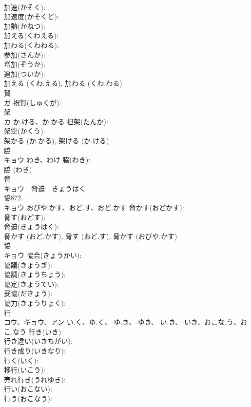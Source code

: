 \documentclass[8pt]{extreport}
\begin{document}
\begin{CJK}{UTF8}{min}
\\	加速(かそく): 
\\	加速度(かそくど): 
\\	加熱(かねつ): 
\\	加える(くわえる): 
\\	加わる(くわわる): 
\\	参加(さんか): 
\\	増加(ぞうか): 
\\	追加(ついか): 
\\	加える (くわ.える), 加わる (くわ.わる)
\\	賀			
\\	ガ		祝賀(しゅくが): 
\\	架			
\\	カ	か.ける、か.かる	担架(たんか): 
\\	架空(かくう): 
\\	架かる (か.かる), 架ける (か.ける)
\\	脇			
\\	キョウ	わき、わけ	脇(わき): 
\\	脇 (わき)
\\	脅			
\\	キョウ　脅迫　きょうはく 
\\	協872.	
\\	キョウ	おびや.かす、おど.す、おど.かす	脅かす(おどかす): 
\\	脅す(おどす): 
\\	脅迫(きょうはく): 
\\	脅かす (おど.かす), 脅す (おど.す), 脅かす (おびや.かす)
\\	協			
\\	キョウ		協会(きょうかい): 
\\	協議(きょうぎ): 
\\	協調(きょうちょう): 
\\	協定(きょうてい): 
\\	妥協(だきょう): 
\\	協力(きょうりょく): 
\\	行			
\\	コウ、ギョウ、アン	い.く、ゆ.く、-ゆ.き、-ゆき、-い.き、-いき、おこな.う、おこ.なう	行き(いき): 
\\	行き違い(いきちがい): 
\\	行き成り(いきなり): 
\\	行く(いく): 
\\	移行(いこう): 
\\	売れ行き(うれゆき): 
\\	行い(おこない): 
\\	行う(おこなう): 

\end{CJK}
\end{document}

